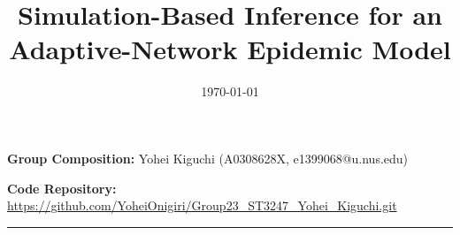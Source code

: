 \documentclass[12pt]{article}
\begin{document}
\title{Simulation-Based Inference for an Adaptive-Network Epidemic Model}
\date{\today}
\maketitle
\thispagestyle{empty}

\centerline{\textbf{Group Composition:} Yohei Kiguchi (A0308628X, e1399068@u.nus.edu)}
\vspace{1em}
\centerline{\textbf{Code Repository:} \url{https://github.com/YoheiOnigiri/Group23_ST3247_Yohei_Kiguchi.git}}
\vspace{1em}
\hrule
\vspace{1.5em}








\clearpage
\printbibliography
\end{document}
